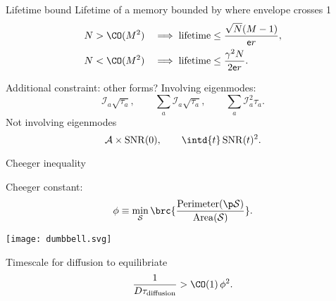 \documentclass{beamer}%
\DeclareMathOperator{\snr}{SNR}
\newcommand{\initial}{\mathcal{I}}
\newcommand{\area}{\mathcal{A}}
\newcommand{\CS}{\mathcal{S}}
\renewcommand{\e}{\mathsf{e}}
\begin{document}

\begin{frame}{Lifetime bound}
%
 Lifetime of a memory bounded by where envelope crosses 1
 \begin{equation*}
 \begin{aligned}
   N &> \CO(M^2) &\implies
   \text{lifetime} &\leq \frac{\sqrt{N}(M-1)}{\e r}, \\
   N &< \CO(M^2) &\implies
   \text{lifetime} &\leq \frac{\gamma^2{N}}{2\e r}.
 \end{aligned}
 \end{equation*}
%
\end{frame}


\begin{frame}{Additional constraint: other forms?}
%
 Involving eigenmodes:
 \begin{equation*}
   \initial_a \sqrt{\tau_a},
   \qquad
   \sum_a \initial_a \sqrt{\tau_a},
   \qquad
   \sum_a \initial_a^2 {\tau_a}.
 \end{equation*}
 Not involving eigenmodes
 \begin{equation*}
   \area \times \snr(0),
   \qquad
   \intd{t} \snr(t)^2.
 \end{equation*}
%
\end{frame}


\begin{frame}{Cheeger inequality}
%
 \parbox{5cm}{
 Cheeger constant:
 \begin{equation*}
   \phi \equiv \min_\CS \brc{\frac{\operatorname{Perimeter}(\p\CS)}{\operatorname{Area}(\CS)}}.
 \end{equation*}
 }
 \parbox{6cm}{
   \texttt{[image: dumbbell.svg]}
 }
 Timescale for diffusion to equilibriate
 \begin{equation*}
   \frac{1}{D \tau_{\text{diffusion}}} > \CO(1)\, \phi^2.
 \end{equation*}
%
\end{frame}
\end{document}
